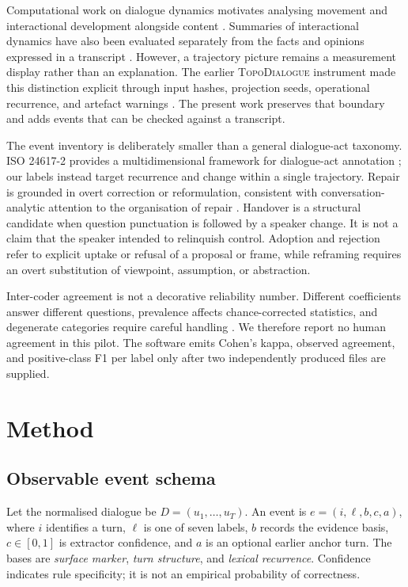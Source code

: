 \documentclass[11pt]{article}
\newcommand{\system}{\textsc{TopoDialogue}}
\begin{document}
Computational work on dialogue dynamics motivates analysing movement and
interactional development alongside content \citep{fischer2024trajectories}.
Summaries of interactional dynamics have also been evaluated separately from
the facts and opinions expressed in a transcript \citep{hua2024dynamics}.
However, a trajectory picture remains a measurement display rather than an
explanation. The earlier \system{} instrument made this distinction explicit
through input hashes, projection seeds, operational recurrence, and artefact
warnings \citep{sakakibara2026instrument}. The present work preserves that
boundary and adds events that can be checked against a transcript.

The event inventory is deliberately smaller than a general dialogue-act
taxonomy. ISO 24617-2 provides a multidimensional framework for dialogue-act
annotation \citep{iso2020dialogue}; our labels instead target recurrence and
change within a single trajectory. Repair is grounded in overt correction or
reformulation, consistent with conversation-analytic attention to the
organisation of repair \citep{schegloff1977repair}. Handover is a structural
candidate when question punctuation is followed by a speaker change. It is not
a claim that the speaker intended to relinquish control. Adoption and rejection
refer to explicit uptake or refusal of a proposal or frame, while reframing
requires an overt substitution of viewpoint, assumption, or abstraction.

Inter-coder agreement is not a decorative reliability number. Different
coefficients answer different questions, prevalence affects chance-corrected
statistics, and degenerate categories require careful handling
\citep{artstein2008agreement}. We therefore report no human agreement in this
pilot. The software emits Cohen's kappa, observed agreement, and positive-class
F1 per label only after two independently produced files are supplied.

\section{Method}

\subsection{Observable event schema}

Let the normalised dialogue be $D=(u_1,\ldots,u_T)$. An event is
$e=(i,\ell,b,c,a)$, where $i$ identifies a turn, $\ell$ is one of seven labels,
$b$ records the evidence basis, $c\in[0,1]$ is extractor confidence, and $a$ is
an optional earlier anchor turn. The bases are \emph{surface marker},
\emph{turn structure}, and \emph{lexical recurrence}. Confidence indicates rule
specificity; it is not an empirical probability of correctness.
\end{document}
